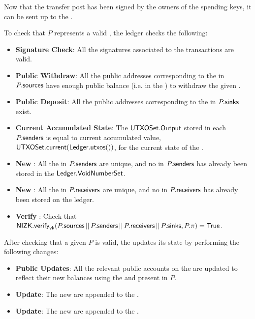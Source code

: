 Now that the transfer post has been signed by the owners of the spending keys, it can be sent up to the \Ledger{}.

\begin{definition}
    To check that $P$ represents a valid \Transfer{}, the ledger checks the following:
    \begin{itemize}
        \item \textbf{Signature Check}: All the signatures associated to the transactions are valid.
        \item \textbf{Public Withdraw}: All the public addresses corresponding to the  in $P.{\textsf{sources}}$ have enough public balance (i.e. in the \PublicLedger{}) to withdraw the given \Asset{}.
        \item \textbf{Public Deposit}: All the public addresses corresponding to the  in $P.{\textsf{sinks}}$ exist.
        \item \textbf{Current Accumulated State}: The ${\textsf{UTXOSet}}.{\textsf{Output}}$ stored in each $P.{\textsf{senders}}$ is equal to current accumulated value, ${\textsf{UTXOSet}}.{\textsf{current}}({\textsf{Ledger}}.{\textsf{utxos}}())$, for the current state of the \Ledger{}.
        \item \textbf{New }: All the  in $P.{\textsf{senders}}$ are unique, and no \VoidNumber{} in $P.{\textsf{senders}}$ has already been stored in the ${\textsf{Ledger}}.{\textsf{VoidNumberSet}}$.
        \item \textbf{New }: All the  in $P.{\textsf{receivers}}$ are unique, and no \UTXO{} in $P.{\textsf{receivers}}$ has already been stored on the ledger.
        \item \textbf{Verify \Transfer{}}: Check that ${\textsf{NIZK}}.{\textsf{verify}}_{\textsf{vk}}(P.{\textsf{sources}} \,||\, P.{\textsf{senders}} \,||\, P.{\textsf{receivers}} \,||\, P.{\textsf{sinks}}, P.\pi) = {\textsf{True}}$.
    \end{itemize}
\end{definition}

\begin{definition}
    After checking that a given \TransferPost{} $P$ is valid, the \Ledger{} updates its state by performing the following changes:
    \begin{itemize}
        \item \textbf{Public Updates}: All the relevant public accounts on the \PublicLedger{} are updated to reflect their new balances using the  and  present in $P$.
        \item \textbf{\UTXOSet{} Update}: The new  are appended to the \UTXOSet{}.
        \item \textbf{\VoidNumberSet{} Update}: The new  are appended to the \VoidNumberSet{}.
    \end{itemize}
\end{definition}

